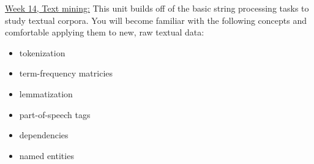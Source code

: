 \documentclass[12pt]{article}
\begin{document}
\bigskip

\underline{Week 14, Text mining:}
This unit builds off of the basic string processing tasks to study textual corpora. You will become familiar with the following concepts and comfortable applying them to new, raw textual data:
\begin{itemize}\setlength\itemsep{0em}
\item tokenization
\item term-frequency matricies
\item lemmatization
\item part-of-speech tags
\item dependencies
\item named entities
\end{itemize}





\end{document}
